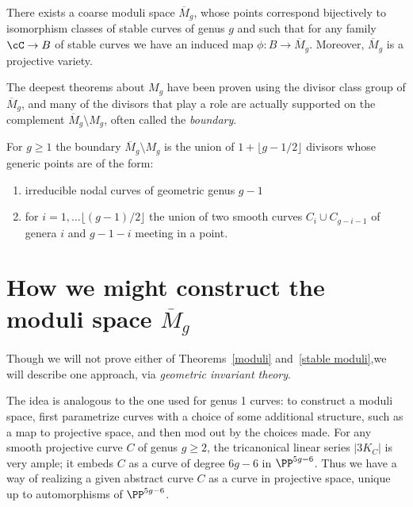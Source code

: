\begin{theorem}\label{stable moduli}
There exists a coarse moduli space $\overline M_g$, whose points correspond bijectively to isomorphism classes of stable curves of genus $g$ and such that for any family $\cC \to B$ of stable curves we have an induced map $\phi : B \to \overline M_g$. Moreover, $\overline M_g$ is a projective variety.
\end{theorem}


The deepest theorems about $M_{g}$ have been proven using the divisor class group of $\overline M_{g}$,
and many of the divisors that play a role are actually supported on the complement $\overline M_{g} \setminus M_{g}$, often called the \emph{boundary}.

\begin{fact}
\begin{proposition}
For $g\geq 1$ the boundary $\overline M_{g}\setminus M_{g}$ is the union of $1+\lfloor{g-1/2}\rfloor$ divisors whose generic points are of the form:
\begin{enumerate}
 \item irreducible nodal curves of geometric genus $g-1$
 \item for $i = 1, \dots \lfloor{(g-1)/2}\rfloor$ the union of two smooth curves $C_{i}\cup C_{g-i-1}$ of genera
 $i$ and $g-1-i$ meeting in a point.
\end{enumerate}
\end{proposition}
\end{fact}


\section{How we might construct the moduli space $\overline M_g$}

Though we will not prove either of Theorems~\ref{moduli} and~\ref{stable moduli},we will describe one approach, via \emph{geometric invariant theory}.

The  idea  is  analogous to the one used  for genus 1 curves: to construct a moduli space, first parametrize curves with a choice of some additional structure, such as a map to projective space, and then mod out by the choices made. For any smooth projective curve $C$ of genus $g\geq 2$, the tricanonical linear series $|3K_C|$ is very ample; it embeds $C$ as a curve of degree $6g-6$ in $\PP^{5g-6}$. Thus we have a way of realizing a given abstract curve $C$ as a curve in projective space, unique up to automorphisms of $\PP^{5g-6}$.

